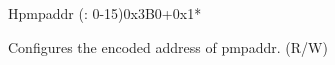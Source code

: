 \begin{register}{H}{pmpaddr (: 0-15)}{0x3B0+0x1*}\label{regdesc:lppmpaddrN}
%
\regnewline%
\begin{regdesc}\begin{reglist}
\label{fielddesc:LPPMPADDR}\item [address] Configures the encoded address of pmpaddr. (R/W)
\end{reglist}\end{regdesc}
\end{register}

